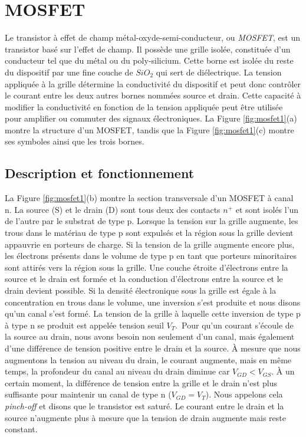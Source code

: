 
\newpage
\section{MOSFET}
\label{sec:mosfet}
Le transistor à effet de champ métal-oxyde-semi-conducteur, ou \emph{MOSFET}, est un transistor basé sur l'effet de champ. Il possède une grille isolée, constituée d'un conducteur tel que du métal ou du poly-silicium. Cette borne est isolée du reste du dispositif par une fine couche de $SiO_2$ qui sert de diélectrique. La tension appliquée à la grille détermine la conductivité du dispositif et peut donc contrôler le courant entre les deux autres bornes nommées source et drain. Cette capacité à modifier la conductivité en fonction de la tension appliquée peut être utilisée pour amplifier ou commuter des signaux électroniques. La Figure \ref{fig:mosfet1}(a) montre la structure d'un MOSFET, tandis que la Figure \ref{fig:mosfet1}(c) montre ses symboles ainsi que les trois bornes.
\subsection{Description et fonctionnement}
La Figure \ref{fig:mosfet1}(b) montre la section transversale d'un MOSFET à canal n. La source (S) et le drain (D) sont tous deux des contacts $n^+$ et sont isolés l'un de l'autre par le substrat de type p. Lorsque la tension sur la grille augmente, les trous dans le matériau de type p sont expulsés et la région sous la grille devient appauvrie en porteurs de charge. Si la tension de la grille augmente encore plus, les électrons présents dans le volume de type p en tant que porteurs minoritaires sont attirés vers la région sous la grille. Une couche étroite d'électrons entre la source et le drain est formée et la conduction d'électrons entre la source et le drain devient possible. Si la densité électronique sous la grille est égale à la concentration en trous dans le volume, une inversion s'est produite et nous disons qu'un canal s'est formé. La tension de la grille à laquelle cette inversion de type p à type n se produit est appelée tension seuil $V_T$.\
Pour qu'un courant s'écoule de la source au drain, nous avons besoin non seulement d'un canal, mais également d'une différence de tension positive entre le drain et la source. À mesure que nous augmentons la tension au niveau du drain, le courant augmente, mais en même temps, la profondeur du canal au niveau du drain diminue car $V_{GD} < V_{GS}$. À un certain moment, la différence de tension entre la grille et le drain n'est plus suffisante pour maintenir un canal de type n ($V_{GD} = V_T$). Nous appelons cela \emph{pinch-off} et disons que le transistor est saturé. Le courant entre le drain et la source n'augmente plus à mesure que la tension de drain augmente mais reste constant.

